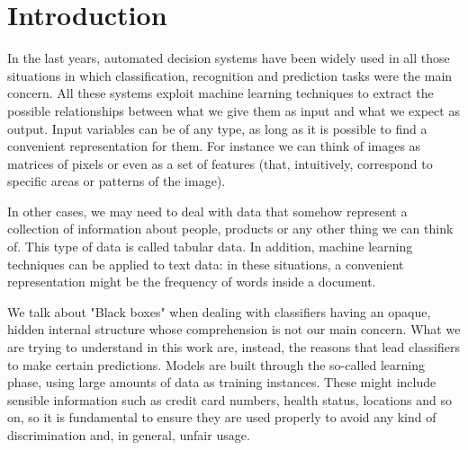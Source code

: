 \documentclass[12pt, twoside, a4paper]{report}
\newcommand{\whitepage}{\clearpage
						\thispagestyle{empty}
						\phantom{a}
						\vfill}
\begin{document}


\whitepage

\sloppy
\nocite{*}

\newpage

\thispagestyle{empty}

\normalsize
\tableofcontents

\chapter{Introduction}

In the last years, automated decision systems have been widely used in all those situations in which classification, recognition and prediction tasks were the main concern. All these systems exploit machine learning techniques to extract the possible relationships between what we give them as input and what we expect as output. Input variables can be of any type, as long as it is possible to find a convenient representation for them. For instance we can think of images as matrices of pixels or even as a set of features (that, intuitively, correspond to specific areas or patterns of the image). 

In other cases, we may need to deal with data that somehow represent a collection of information about people, products or any other thing we can think of. This type of data is called tabular data. In addition, machine learning techniques can be applied to text data: in these situations, a convenient representation might be the frequency of words inside a document.

We talk about "Black boxes" when dealing with classifiers having an opaque, hidden internal structure whose comprehension is not our main concern. What we are trying to understand in this work are, instead, the reasons that lead classifiers to make certain predictions. Models are built through the so-called learning phase, using large amounts of data as training instances. These might include sensible information such as credit card numbers, health status, locations and so on, so it is fundamental to ensure they are used properly to avoid any kind of discrimination and, in general, unfair usage. 
\end{document}
